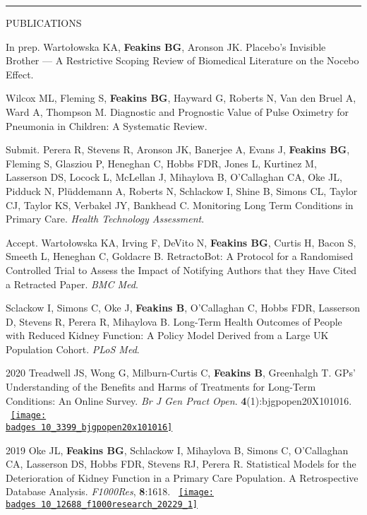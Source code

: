\documentclass[10pt,a4paper]{article}
\def\badges{./badges/}
\begin{document}
\noindent\rule{\textwidth}{0.4pt}
\begin{cvlist}{PUBLICATIONS}
	
	\item[In prep.]
	Warto\l{}owska KA, \textbf{Feakins BG}, Aronson JK. Placebo’s Invisible Brother --- A Restrictive Scoping Review of Biomedical Literature on the Nocebo Effect.
	
	\item[]
	Wilcox ML, Fleming S, \textbf{Feakins BG}, Hayward G, Roberts N, Van den Bruel A, Ward A, Thompson M. Diagnostic and Prognostic Value of Pulse Oximetry for Pneumonia in Children: A Systematic Review.
	
	\item[Submit.]
	Perera R, Stevens R, Aronson JK, Banerjee A, Evans J, \textbf{Feakins BG}, Fleming S, Glasziou P, Heneghan C, Hobbs FDR, Jones L, Kurtinez M, Lasserson DS, Locock L, McLellan J, Mihaylova B, O'Callaghan CA, Oke JL, Pidduck N, Pl\"uddemann A, Roberts N, Schlackow I, Shine B, Simons CL, Taylor CJ, Taylor KS, Verbakel JY, Bankhead C. Monitoring Long Term Conditions in Primary Care. \textit{Health Technology Assessment}.
	
	\item[Accept.]
	Warto\l{}owska KA, Irving F, DeVito N, \textbf{Feakins BG}, Curtis H, Bacon S, Smeeth L, Heneghan C, Goldacre B. RetractoBot: A Protocol for a Randomised Controlled Trial to Assess the Impact of Notifying Authors that they Have Cited a Retracted Paper. \textit{BMC Med}. 
	
	\item[]
	Sclackow I, Simons C, Oke J, \textbf{Feakins B}, O'Callaghan C, Hobbs FDR, Lasserson D, Stevens R, Perera R, Mihaylova B. Long-Term Health Outcomes of People with Reduced Kidney Function: A Policy Model Derived from a Large UK Population Cohort. \textit{PLoS Med}.
	
	\item[2020]
	Treadwell JS, Wong G, Milburn-Curtis C, \textbf{Feakins B}, Greenhalgh T. GPs' Understanding of the Benefits and Harms of Treatments for Long-Term Conditions: An Online Survey. \textit{Br J Gen Pract Open}. \textbf{4}(1):bjgpopen20X101016. ~\href{https://www.altmetric.com/details/77018222}{\texttt{[image: \\badges 10\_3399\_bjgpopen20x101016]}}
	
	\item[2019]
	Oke JL, \textbf{Feakins BG}, Schlackow I, Mihaylova B, Simons C, O'Callaghan CA, Lasserson DS, Hobbs FDR, Stevens RJ, Perera R. Statistical Models for the Deterioration of Kidney Function in a Primary Care Population. A Retrospective Database Analysis. \textit{F1000Res}, \textbf{8}:1618. ~\href{https://f1000research.altmetric.com/details/66389361}{\texttt{[image: \\badges 10\_12688\_f1000research\_20229\_1]}}
	

\end{cvlist}
\end{document}
